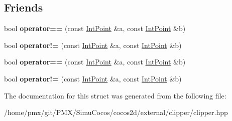 \subsection*{Friends}
\begin{DoxyCompactItemize}
\item 
\mbox{\label{structClipperLib_1_1IntPoint_a6afef09ee09723a387e3046287e2635b}} 
bool {\bfseries operator==} (const \hyperlink{structClipperLib_1_1IntPoint}{Int\+Point} \&a, const \hyperlink{structClipperLib_1_1IntPoint}{Int\+Point} \&b)
\item 
\mbox{\label{structClipperLib_1_1IntPoint_aa37b2afb6cbc44cb9cd13ecc009decfb}} 
bool {\bfseries operator!=} (const \hyperlink{structClipperLib_1_1IntPoint}{Int\+Point} \&a, const \hyperlink{structClipperLib_1_1IntPoint}{Int\+Point} \&b)
\item 
\mbox{\label{structClipperLib_1_1IntPoint_a6afef09ee09723a387e3046287e2635b}} 
bool {\bfseries operator==} (const \hyperlink{structClipperLib_1_1IntPoint}{Int\+Point} \&a, const \hyperlink{structClipperLib_1_1IntPoint}{Int\+Point} \&b)
\item 
\mbox{\label{structClipperLib_1_1IntPoint_aa37b2afb6cbc44cb9cd13ecc009decfb}} 
bool {\bfseries operator!=} (const \hyperlink{structClipperLib_1_1IntPoint}{Int\+Point} \&a, const \hyperlink{structClipperLib_1_1IntPoint}{Int\+Point} \&b)
\end{DoxyCompactItemize}


The documentation for this struct was generated from the following file\+:\begin{DoxyCompactItemize}
\item 
/home/pmx/git/\+P\+M\+X/\+Simu\+Cocos/cocos2d/external/clipper/clipper.\+hpp\end{DoxyCompactItemize}
